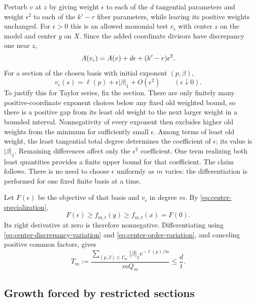Perturb $v$ at $z$ by giving weight $\epsilon$ to each of the $d$
tangential parameters and weight $\epsilon^2$ to each of the $k'-r$
fiber parameters, while leaving its positive weights unchanged. For
$\epsilon>0$ this is an allowed monomial test $v_\epsilon$ with center
$z$ on the model and center $y$ on $X$. Since the added coordinate
divisors have discrepancy one near $z$,
\begin{equation}\label{eq:center-discrepancy-variation}
 A(v_\epsilon)=A(v)+d\epsilon+(k'-r)\epsilon^2.
\end{equation}
For a section of the chosen basis with initial exponent $(p,\beta)$,
\begin{equation}\label{eq:center-order-variation}
 v_\epsilon(s)=\ell(p)+\epsilon|\beta|_1+O(\epsilon^2)
 \qquad(\epsilon\downarrow0).
\end{equation}
To justify this for Taylor series, fix the section. There are only
finitely many positive-coordinate exponent choices below any fixed
old weighted bound, so there is a positive gap from its least old
weight to the next larger weight in a bounded interval. Nonnegativity
of every exponent then excludes higher old weights from the minimum
for sufficiently small $\epsilon$. Among terms of least old weight,
the least tangential total degree determines the coefficient of
$\epsilon$; its value is $|\beta|_1$. Remaining differences affect only
the $\epsilon^2$ coefficient. One term realizing both least quantities
provides a finite upper bound for that coefficient. The claim follows.
There is no need to choose $\epsilon$ uniformly as $m$ varies: the
differentiation is performed for one fixed finite basis at a time.

Let $F(\epsilon)$ be the objective of that basis and $v_\epsilon$ in
degree $m$. By \eqref{eq:center-specialization},
\[
 F(\epsilon)\ge f_{m,t}(y)\ge f_{m,t}(x)=F(0).
\]
Its right derivative at zero is therefore nonnegative. Differentiating
using \eqref{eq:center-discrepancy-variation} and
\eqref{eq:center-order-variation}, and canceling positive common
factors, gives
\begin{equation}\label{eq:center-variation-upper}
 T_m:=\frac{\displaystyle\sum_{(p,\beta)\in\Gamma_m}
                 |\beta|_1e^{-\ell(p)/m}}
                {mQ_m}
       \le\frac dt.
\end{equation}

\subsection{Growth forced by restricted sections}

